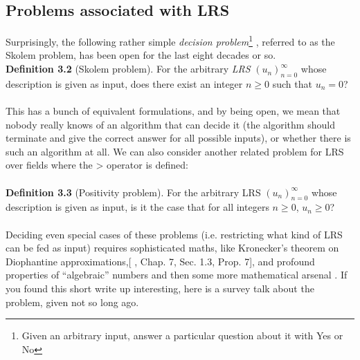 \documentclass{article}
\begin{document}
\subsection{Problems associated with LRS
}
Surprisingly, the following rather simple  \textit{decision problem}\footnote{Given an arbitrary input, answer a particular question about it with Yes or No}
, referred to as the Skolem problem,
has been open for the last eight decades or so.\\
\textbf{Definition 3.2} (Skolem problem). For the arbitrary \textit{LRS} $(u_n)_{n=0}^{\infty}$ whose description is given as
input, does there exist an integer $n \geq 0$ such that $u_n = 0$?\\
\\
This has a bunch of equivalent formulations, and by being open, we mean that nobody really
knows of an algorithm that can decide it (the algorithm should terminate and give the correct
answer for all possible inputs), or whether there is such an algorithm at all.
We can also consider another related problem for LRS over fields where the > operator is defined:\\
\\
\textbf{Definition 3.3} (Positivity problem). For the arbitrary LRS $(u_n)_{n=0}^{\infty}$ whose description is given
as input, is it the case that for all integers $n \geq 0$, $u_n \geq 0$?\\
\\
Deciding even special cases of these problems (i.e. restricting what kind of LRS can be fed as
input) requires sophisticated maths, like Kronecker’s theorem on Diophantine approximations,[ \cite{second},
Chap. 7, Sec. 1.3, Prop. 7], and profound properties of “algebraic” numbers \cite{third} and then some
more mathematical arsenal \cite{first,fourth}.
If you found this short write up interesting, here is a survey talk about the problem, given not so long ago.
\newpage
\end{document}
